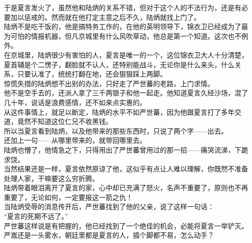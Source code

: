 \begin{multicols}{\theparacolNo}
于是夏言发火了，虽然他和陆炳的关系不错，但对于这个人的不法行为，还是有必要加以惩戒的。然而就在他打定主意之后不久，陆炳就找上门了。\\

陆炳不是吃干饭的，他是搞特务工作的，在他的英明领导下，锦衣卫已经成为了最为可怕的情报机器，但凡京城里有什么风吹草动，他总是第一个知道。这次也不例外。\\

在京城里，陆炳很少有害怕的人，夏言是唯一的一个，这位锦衣卫大人十分清楚，夏首辅是个二愣子，翻脸就不认人，还特别能战斗，无论你是什么来头，什么关系，只要认准了，统统打翻在地，还会狠狠踩上两脚。\\

惊慌失措的陆炳想不出别的办法，只好走了严世蕃的老路，上门求情。\\

他不是空手去的，还派人拿了三千两银子和他一起走。他知道夏言久经沙场，混了几十年，说话是浪费感情，还不如来点实惠的。\\

从这件事情上，就足以断定，陆炳的水平不如严世蕃，因为他跟夏言打了多年交道，竟然不知道这位仁兄不收黑钱。\\

所以当夏言看到陆炳，以及他带来的那些东西时，只说了两个字——出去。\\

还加上一句——从哪里带来的，就带回哪里去。\\

陆炳也懵了，他情急之下，只得用出了严世蕃曾用过的那一招——痛哭流涕，下跪求饶。\\

当然结果还是一样，夏言依然原谅了他，这似乎有点让人难以理解，你既然不准备处理人家，干嘛要这么穷折腾。\\

陆炳带着眼泪离开了夏言的家，心中却已充满了怒火，名声不重要了，原则也不再重要了，无论如何，一定要报这一箭之仇！\\

当陆炳受辱的消息传开后，严世蕃找到了他的父亲，说了这样一句话：\\

“夏言的死期不远了。”\\

严世蕃这样说是有把握的，他已经找到了一个绝佳的机会，必能将夏言一举铲灭。\\

严嵩还是一头雾水，朝廷里都是夏言的人，插个脚都不易，怎么动手？\\


\end{multicols}
